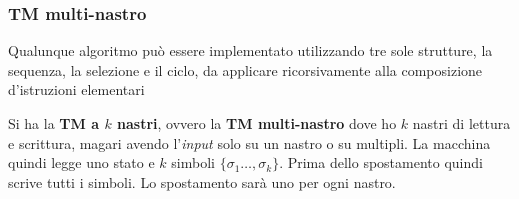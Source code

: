 \subsubsection{TM multi-nastro}
\begin{definizione}
  Qualunque algoritmo può essere implementato utilizzando tre sole strutture, la
  sequenza, la selezione e il ciclo, da applicare ricorsivamente alla
  composizione d'istruzioni elementari
\end{definizione}
\begin{definizione}
  Si ha la \textbf{TM a $k$ nastri}, ovvero la \textbf{TM
    multi-nastro} dove ho $k$ nastri di lettura e scrittura, magari avendo
  l'\textit{input} solo su un nastro o su multipli. La macchina quindi legge uno stato e
  $k$ simboli $\{\sigma_1\ldots,\sigma_k\}$. Prima dello spostamento quindi
  scrive tutti i simboli. Lo spostamento sarà uno per ogni nastro.
\end{definizione}
